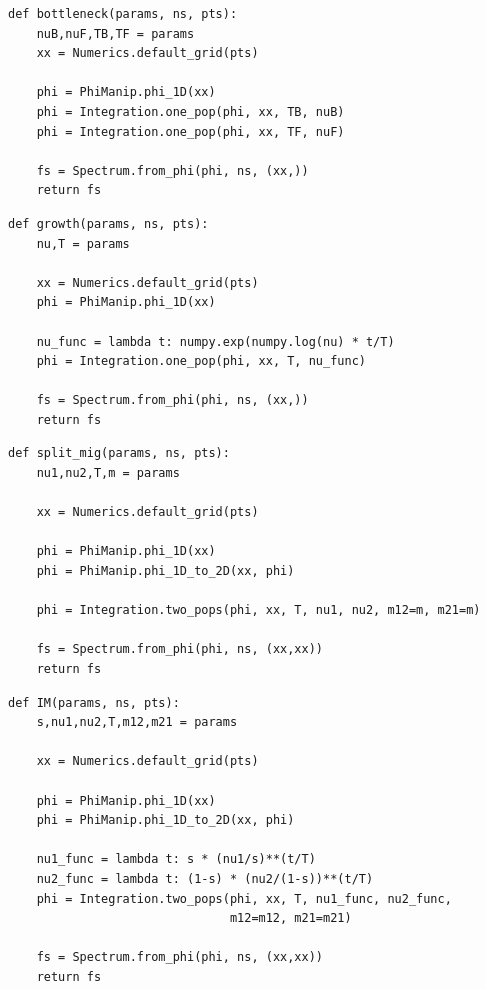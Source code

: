 \documentclass[12pt]{article}
\makeatletter
\newcommand{\py}[1]{\lstinline[language=Python, showstringspaces=False]@#1@}
\makeatother
\begin{document}
\clearpage

\begin{lstlisting}[caption={\textbf{Bottleneck:} At time \py{TF} + \py{TB} in the past, an equilibrium population goes through a bottleneck of depth \py{nuB}, recovering to relative size \py{nuF}.}, float, label={lst:bottleneck}]
def bottleneck(params, ns, pts):
    nuB,nuF,TB,TF = params
    xx = Numerics.default_grid(pts)
    
    phi = PhiManip.phi_1D(xx)
    phi = Integration.one_pop(phi, xx, TB, nuB)
    phi = Integration.one_pop(phi, xx, TF, nuF)

    fs = Spectrum.from_phi(phi, ns, (xx,))
    return fs
\end{lstlisting}

\begin{lstlisting}[caption={\textbf{Exponential growth:} At time \py{T} in the past, an equilibrium population begins growing exponentially, reaching size \py{nu} at present.}, float]
def growth(params, ns, pts):
    nu,T = params

    xx = Numerics.default_grid(pts)
    phi = PhiManip.phi_1D(xx)

    nu_func = lambda t: numpy.exp(numpy.log(nu) * t/T)
    phi = Integration.one_pop(phi, xx, T, nu_func)

    fs = Spectrum.from_phi(phi, ns, (xx,))
    return fs
\end{lstlisting}

\begin{lstlisting}[caption={\textbf{Split with migration:} At time \py{T} in the past, two population diverge from an equilibrium population, with relative sizes \py{nu1} and \py{nu2} and with symmetric migration at rate \py{m}.}, float]
def split_mig(params, ns, pts):
    nu1,nu2,T,m = params

    xx = Numerics.default_grid(pts)

    phi = PhiManip.phi_1D(xx)
    phi = PhiManip.phi_1D_to_2D(xx, phi)

    phi = Integration.two_pops(phi, xx, T, nu1, nu2, m12=m, m21=m)

    fs = Spectrum.from_phi(phi, ns, (xx,xx))
    return fs
\end{lstlisting}

\begin{lstlisting}[caption={\textbf{Two-population isolation-with-migration:} The ancestral population splits into two, with a fraction \py{s} going into pop 1 and fraction \py{1-s} into pop 2. The populations then grow exponentially, with asymmetric migration allowed between them.}, float]
def IM(params, ns, pts):
    s,nu1,nu2,T,m12,m21 = params

    xx = Numerics.default_grid(pts)

    phi = PhiManip.phi_1D(xx)
    phi = PhiManip.phi_1D_to_2D(xx, phi)

    nu1_func = lambda t: s * (nu1/s)**(t/T)
    nu2_func = lambda t: (1-s) * (nu2/(1-s))**(t/T)
    phi = Integration.two_pops(phi, xx, T, nu1_func, nu2_func,
                               m12=m12, m21=m21)

    fs = Spectrum.from_phi(phi, ns, (xx,xx))
    return fs
\end{lstlisting}
\end{document}
